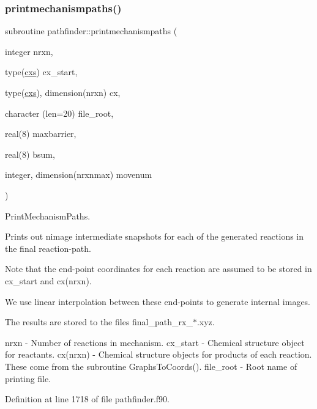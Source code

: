 \subsubsection{\texorpdfstring{printmechanismpaths()}{printmechanismpaths()}\hspace{0.1cm}{\footnotesize\ttfamily [1/3]}}
{\footnotesize\ttfamily subroutine pathfinder\+::printmechanismpaths (\begin{DoxyParamCaption}\item[{integer}]{nrxn,  }\item[{type(\mbox{\hyperlink{structchemstr_1_1cxs}{cxs}})}]{cx\+\_\+start,  }\item[{type(\mbox{\hyperlink{structchemstr_1_1cxs}{cxs}}), dimension(nrxn)}]{cx,  }\item[{character (len=20)}]{file\+\_\+root,  }\item[{real(8)}]{maxbarrier,  }\item[{real(8)}]{bsum,  }\item[{integer, dimension(nrxnmax)}]{movenum }\end{DoxyParamCaption})}



Print\+Mechanism\+Paths. 

Prints out nimage intermediate snapshots for each of the generated reactions in the final reaction-\/path.

Note that the end-\/point coordinates for each reaction are assumed to be stored in cx\+\_\+start and cx(nrxn).

We use linear interpolation between these end-\/points to generate internal images.

The results are stored to the files final\+\_\+path\+\_\+rx\+\_\+$\ast$.xyz.

nrxn -\/ Number of reactions in mechanism. cx\+\_\+start -\/ Chemical structure object for reactants. cx(nrxn) -\/ Chemical structure objects for products of each reaction. These come from the subroutine Graphs\+To\+Coords(). file\+\_\+root -\/ Root name of printing file. 

Definition at line 1718 of file pathfinder.\+f90.

\mbox{\label{namespacepathfinder_a38a57e9848ee768d8e19891d5fa91ff0}} 
